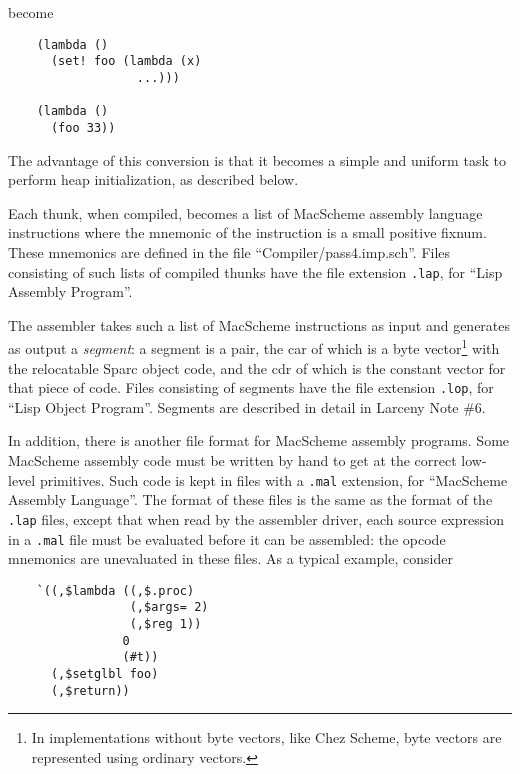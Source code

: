 \noindent become

\begin{minipage}{\linewidth}
\begin{verbatim}
    (lambda ()
      (set! foo (lambda (x)
                  ...)))

    (lambda ()
      (foo 33))
\end{verbatim}
\end{minipage}

\noindent The advantage of this conversion is that it becomes a simple and
uniform task to perform heap initialization, as described below.

Each thunk, when compiled, becomes a list of MacScheme assembly language
instructions where the mnemonic of the instruction is a small positive
fixnum. These mnemonics are defined in the file ``Compiler/pass4.imp.sch''.
Files consisting of such lists of compiled thunks have the file 
extension {\tt .lap}, for ``Lisp Assembly Program''.

The assembler takes such a list of MacScheme instructions as input and
generates as output a {\em segment}: a segment is a pair, the car of
which is a byte vector\footnote{In implementations without byte
vectors, like Chez Scheme, byte vectors are represented using ordinary
vectors.} with the relocatable Sparc object code, and the cdr of which
is the constant vector for that piece of code.  Files consisting of
segments have the file extension {\tt .lop}, for ``Lisp Object
Program''. Segments are described in detail in Larceny Note \#6.

In addition, there is another file format for MacScheme assembly
programs.  Some MacScheme assembly code must be written by hand to get
at the correct low-level primitives. Such code is kept in files with a
{\tt .mal} extension, for ``MacScheme Assembly Language''. The format
of these files is the same as the format of the {\tt .lap} files,
except that when read by the assembler driver, each source expression
in a {\tt .mal} file must be evaluated before it can be assembled: the
opcode mnemonics are unevaluated in these files.  As a typical
example, consider

\begin{minipage}{\linewidth}
\begin{verbatim}
    `((,$lambda ((,$.proc)
                 (,$args= 2)
                 (,$reg 1))
                0
                (#t))
      (,$setglbl foo)
      (,$return))
\end{verbatim}
\end{minipage}

